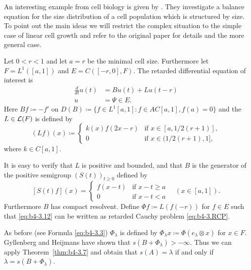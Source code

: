 \begin{example}\label{ex:b4-3.12}
	An interesting example from cell biology is given by \citet{gyllenbergheijmans:1987}. 
	They investigate a balance equation for the size distribution of a cell population which is structured by size. 
	To point out the main ideas we will restrict the complex situation to the simple case of linear cell growth and refer to the original paper for details and the more general case.
	
    Let $0 < r < 1$ and let $a = r$ be the minimal cell size. 
    Furthermore let $F = L^1([a,1])$ and $E = C([-r,0],F)$. 
    The retarded differential equation of interest is 
    \begin{equation}\label{eq:b4-3.12}
            \begin{aligned}
        \frac{d}{dt}u(t) &= Bu(t) + Lu(t-r)\\
        u &= \Psi \in E.
        \end{aligned}
    \end{equation}
Here $Bf  \coloneq  -f'$ on $D(B) \coloneq \{f \in L^1[a,1] \colon f \in AC[a,1], f(a) = 0\}$ and the $L \in \mathcal{L}(F) $ is defined by
\[
(Lf)(x) \coloneq 
\begin{cases}
	k(x)f(2x-r) & \text{if } x \in [a,1/2(r+1)] , \\
	0 & \text{if } x \in (1/2(r+1),1] ,
\end{cases}
\]
where $k \in C[a,1]$.

It is easy to verify that $L$ is positive and bounded, and that $B$ is the generator of the positive semigroup $(S(t))_{t\geq0}$ defined by
\[
[S(t)f](x) = 
\begin{cases}
	f(x-t) & \text{if } x-t \geq a \\
	0 & \text{if } x-t < a
\end{cases}
\quad (x \in [a,1]).
\]
Furthermore $B$ has compact resolvent. 
Define $\Phi f  \coloneq  L(f(-r))$ for $f \in E$ such that \eqref{eq:b4-3.12} can be written as retarded Cauchy problem \eqref{eq:b4-3.RCP}.

As before (see Formula \eqref{eq:b4-3.3}) $\Phi_{\lambda}$ is defined by $\Phi_{\lambda}x  \coloneq  \Phi(e_{\lambda}\otimes x)$ for $x \in F$. 
Gyllenberg and Heijmans have shown that $s(B + \Phi_{\lambda}) > -\infty$. 
Thus we can apply Theorem~\ref{thm:b4-3.7} and obtain that $s(A) = \lambda$ if and only if $\lambda = s(B + \Phi_{\lambda})$.
\end{example}


